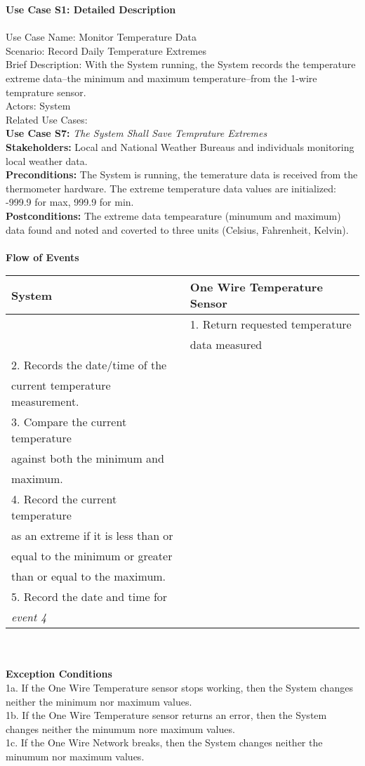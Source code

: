 \documentclass[letterpaper]{article}
\begin{document}
\noindent
\textbf{Use Case S1:  Detailed Description}\\\\
Use Case Name:  Monitor Temperature Data\\
Scenario:  Record  Daily Temperature Extremes\\
Brief Description:  With the System running, the System records the
temperature extreme data--the minimum and maximum temperature--from
the 1-wire temprature sensor.\\
Actors:  System\\
Related Use Cases:\\
\textbf{Use Case S7:  }\emph{The System Shall Save Temprature
Extremes}\\
\textbf{Stakeholders:  }Local and National Weather Bureaus and
individuals monitoring local weather data.\\
\textbf{Preconditions:  }The System is running, the temerature data
is received from the thermometer hardware. The extreme temperature
data values are initialized: -999.9 for max, 999.9 for min.\\
\textbf{Postconditions:  }The extreme data  tempearature (minumum and
maximum) data
found and noted and coverted to three units (Celsius, Fahrenheit,
Kelvin).\\\\
\textbf{Flow of Events}\\
\begin{tabular}{|l|l|}\hline
\textbf{System} & \textbf{One Wire Temperature Sensor}\\\hline
& 1.  Return requested temperature\\ 
&      data  measured\\\hline
2.    Records the date/time of the & \\
       current temperature  measurement. & \\\hline
3.     Compare the current temperature & \\
against both the minimum and & \\
maximum. &\\\hline
4.     Record the current temperature & \\
as an extreme if it is less than or & \\
equal to the minimum or greater & \\
than or equal to the maximum. & \\\hline
5.    Record the date and time for & \\
\emph{event 4} & \\\hline
\end{tabular}\\\\
\textbf{Exception Conditions}\\
1a.  If the One Wire Temperature sensor stops working, then the System
changes neither the minimum nor maximum values.\\
1b.  If the One Wire Temperature sensor returns an error, then the
System changes neither the minumum nore maximum values.\\
1c.  If the One Wire Network breaks, then the System changes neither
the minumum nor maximum values.
\end{document}
